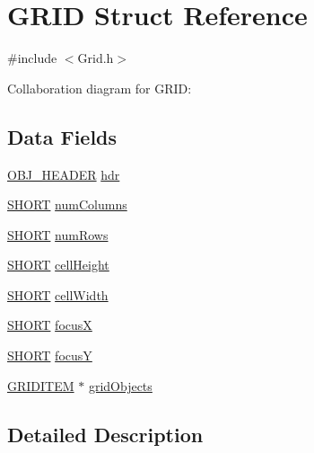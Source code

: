 \hypertarget{struct_g_r_i_d}{}\section{G\+R\+I\+D Struct Reference}
\label{struct_g_r_i_d}


{\ttfamily \#include $<$Grid.\+h$>$}



Collaboration diagram for G\+R\+I\+D\+:
\subsection*{Data Fields}
\begin{DoxyCompactItemize}
\item 
\hyperlink{struct_o_b_j___h_e_a_d_e_r}{O\+B\+J\+\_\+\+H\+E\+A\+D\+E\+R} \hyperlink{struct_g_r_i_d_abeffaf353197a8a64fba6707b68ce0be}{hdr}
\item 
\hyperlink{_generic_type_defs_8h_ae9bb25d3afecf3bfab0fbe3c22c2050f}{S\+H\+O\+R\+T} \hyperlink{struct_g_r_i_d_a1a3eca7f6e09ee471fac874b06f59d00}{num\+Columns}
\item 
\hyperlink{_generic_type_defs_8h_ae9bb25d3afecf3bfab0fbe3c22c2050f}{S\+H\+O\+R\+T} \hyperlink{struct_g_r_i_d_a625bf09095ef5e9bfd30620c676463b6}{num\+Rows}
\item 
\hyperlink{_generic_type_defs_8h_ae9bb25d3afecf3bfab0fbe3c22c2050f}{S\+H\+O\+R\+T} \hyperlink{struct_g_r_i_d_a7791a8408bdda25041026883e493c8e5}{cell\+Height}
\item 
\hyperlink{_generic_type_defs_8h_ae9bb25d3afecf3bfab0fbe3c22c2050f}{S\+H\+O\+R\+T} \hyperlink{struct_g_r_i_d_a428189ddbd271ed447efb425b7cb29e9}{cell\+Width}
\item 
\hyperlink{_generic_type_defs_8h_ae9bb25d3afecf3bfab0fbe3c22c2050f}{S\+H\+O\+R\+T} \hyperlink{struct_g_r_i_d_a816699d44abcc9fe21d9427e71128f86}{focus\+X}
\item 
\hyperlink{_generic_type_defs_8h_ae9bb25d3afecf3bfab0fbe3c22c2050f}{S\+H\+O\+R\+T} \hyperlink{struct_g_r_i_d_a1afb951e441f599c966d78fbcd500ebe}{focus\+Y}
\item 
\hyperlink{struct_g_r_i_d_i_t_e_m}{G\+R\+I\+D\+I\+T\+E\+M} $\ast$ \hyperlink{struct_g_r_i_d_a7b8deccfe6c558ed0b221c77eabea9b9}{grid\+Objects}
\end{DoxyCompactItemize}


\subsection{Detailed Description}


